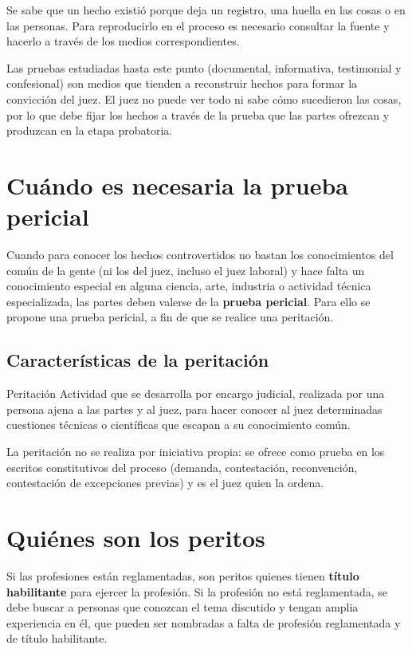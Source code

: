 \documentclass[12pt,oneside]{book}
\begin{document}
Se sabe que un hecho existió porque deja un registro, una huella en las cosas o en las personas. Para reproducirlo en el proceso es necesario consultar la fuente y hacerlo a través de los medios correspondientes.

Las pruebas estudiadas hasta este punto (documental, informativa, testimonial y confesional) son medios que tienden a reconstruir hechos para formar la convicción del juez. El juez no puede ver todo ni sabe cómo sucedieron las cosas, por lo que debe fijar los hechos a través de la prueba que las partes ofrezcan y produzcan en la etapa probatoria.

\section{Cuándo es necesaria la prueba pericial}

Cuando para conocer los hechos controvertidos no bastan los conocimientos del común de la gente (ni los del juez, incluso el juez laboral) y hace falta un conocimiento especial en alguna ciencia, arte, industria o actividad técnica especializada, las partes deben valerse de la \textbf{prueba pericial}. Para ello se propone una prueba pericial, a fin de que se realice una peritación.

\subsection{Características de la peritación}

\begin{definition}{Peritación}
Actividad que se desarrolla por encargo judicial, realizada por una persona ajena a las partes y al juez, para hacer conocer al juez determinadas cuestiones técnicas o científicas que escapan a su conocimiento común.
\end{definition}

La peritación no se realiza por iniciativa propia: se ofrece como prueba en los escritos constitutivos del proceso (demanda, contestación, reconvención, contestación de excepciones previas) y es el juez quien la ordena.

\section{Quiénes son los peritos}

Si las profesiones están reglamentadas, son peritos quienes tienen \textbf{título habilitante} para ejercer la profesión. Si la profesión no está reglamentada, se debe buscar a personas que conozcan el tema discutido y tengan amplia experiencia en él, que pueden ser nombradas a falta de profesión reglamentada y de título habilitante.
\end{document}
